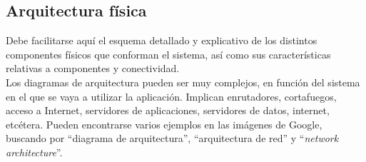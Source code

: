 \subsection{\forlnameref Arquitectura física}
\label{sec:physicalArchitecture}

\begin{shaded}
Debe facilitarse aquí el esquema detallado y explicativo de los distintos componentes físicos que conforman el sistema, así como sus características relativas a componentes y conectividad. \\

Los diagramas de arquitectura pueden ser muy complejos, en función del sistema en el que se vaya a utilizar la aplicación. Implican enrutadores, cortafuegos, acceso a Internet, servidores de aplicaciones, servidores de datos, internet, etcétera. Pueden encontrarse varios ejemplos en las imágenes de Google, buscando por ``diagrama de arquitectura'', ``arquitectura de red'' y ``\textit{network architecture}''.
\end{shaded}